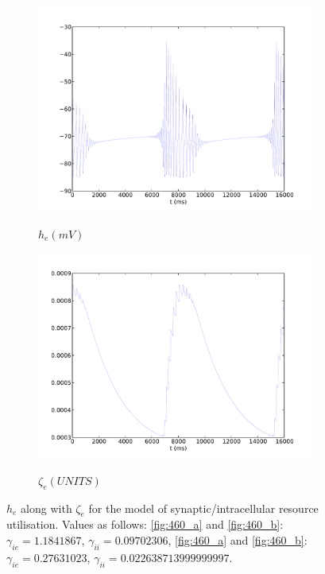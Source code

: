 \documentclass[a4paper,12pt]{article}
\begin{document}
\begin{figure}
\begin{subfigure}[b]{0.5\textwidth}
		\includegraphics[scale=0.35]{chosen-frontiers-2012/00460-0_7-he-intra.pdf}
		\label{fig:460_c}
		\caption{$h_e (mV)$}
	\end{subfigure}
	\begin{subfigure}[b]{0.5\textwidth}
		\includegraphics[scale=0.35]{chosen-frontiers-2012/00460-0_7-slow-intra.pdf}
		\label{fig:460_d}
		\caption{$\zeta_e (UNITS)$}
	\end{subfigure}
	\caption{$h_e$ along with $\zeta_e$ for the model of synaptic/intracellular resource utilisation. 
	Values as follows:
	\ref{fig:460_a} and \ref{fig:460_b}: $\gamma_{ie}=1.1841867$, $\gamma_{ii}=0.09702306$, \ref{fig:460_a} and \ref{fig:460_b}:  $\gamma_{ie}=0.27631023$, $\gamma_{ii}=0.022638713999999997$. 
}
\end{figure}
\end{document}
